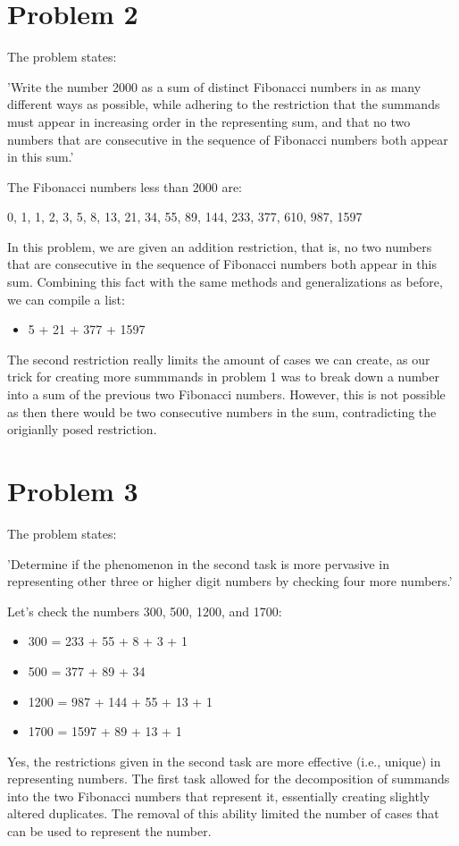 \documentclass[12pt]{article}
\begin{document}
\section{Problem 2}
The problem states:
\begin{center}
'Write the number 2000 as a sum of distinct Fibonacci numbers in as many different ways as possible, while adhering to the restriction that the summands must appear in increasing order in the representing sum, and that no two numbers that are consecutive in the sequence of Fibonacci numbers both appear in this sum.'
\end{center}
The Fibonacci numbers less than 2000 are:
\begin{center}
0, 1, 1, 2, 3, 5, 8, 13, 21, 34, 55, 89, 144, 233, 377, 610, 987, 1597
\end{center}
In this problem, we are given an addition restriction, that is, no two numbers that are consecutive in the sequence of Fibonacci numbers both appear in this sum. Combining this fact with the same methods and generalizations as before, we can compile a list:
\begin{itemize}
    \item 5 + 21 + 377 + 1597
\end{itemize}
The second restriction really limits the amount of cases we can create, as our trick for creating more summmands in problem 1 was to break down a number into a sum of the previous two Fibonacci numbers. However, this is not possible as then there would be two consecutive numbers in the sum, contradicting the origianlly posed restriction.

\section{Problem 3}
The problem states:
\begin{center}
'Determine if the phenomenon in the second task is more pervasive in representing other three or higher digit numbers by checking four more numbers.'
\end{center}
Let's check the numbers 300, 500, 1200, and 1700:
\begin{itemize}
    \item 300 = 233 + 55 + 8 + 3 + 1
    \item 500 = 377 + 89 + 34
    \item 1200 = 987 + 144 + 55 + 13 + 1
    \item 1700 = 1597 + 89 + 13 + 1
\end{itemize}
Yes, the restrictions given in the second task are more effective (i.e., unique) in representing numbers. The first task allowed for the decomposition of summands into the two Fibonacci numbers that represent it, essentially creating slightly altered duplicates. The removal of this ability limited the number of cases that can be used to represent the number.
\end{document}
